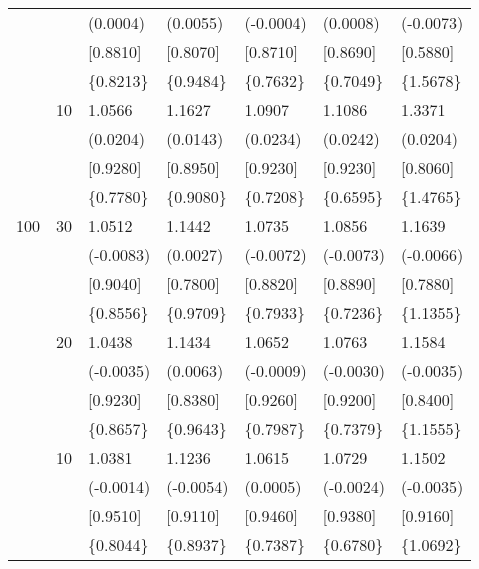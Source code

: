 \begin{table}[H]
{\begin{tabular}{c c | C{2.48cm} | C{2.48cm} | C{2.48cm} | C{2.48cm} | C{2.48cm} }
			&&(0.0004)&(0.0055)&(-0.0004)&(0.0008)&(-0.0073)\\
			&&[0.8810]&[0.8070]&[0.8710]&[0.8690]&[0.5880]\\
			&&\{0.8213\}&\{0.9484\}&\{0.7632\}&\{0.7049\}&\{1.5678\}\\
			&10&1.0566&1.1627&1.0907&1.1086&1.3371\\
			&&(0.0204)&(0.0143)&(0.0234)&(0.0242)&(0.0204)\\
			&&[0.9280]&[0.8950]&[0.9230]&[0.9230]&[0.8060]\\
			&&\{0.7780\}&\{0.9080\}&\{0.7208\}&\{0.6595\}&\{1.4765\}\\
			\cmidrule(lr){1-7}
			100&30&1.0512&1.1442&1.0735&1.0856&1.1639\\
			&&(-0.0083)&(0.0027)&(-0.0072)&(-0.0073)&(-0.0066)\\
			&&[0.9040]&[0.7800]&[0.8820]&[0.8890]&[0.7880]\\
			&&\{0.8556\}&\{0.9709\}&\{0.7933\}&\{0.7236\}&\{1.1355\}\\
			&20&1.0438&1.1434&1.0652&1.0763&1.1584\\
			&&(-0.0035)&(0.0063)&(-0.0009)&(-0.0030)&(-0.0035)\\
			&&[0.9230]&[0.8380]&[0.9260]&[0.9200]&[0.8400]\\
			&&\{0.8657\}&\{0.9643\}&\{0.7987\}&\{0.7379\}&\{1.1555\}\\
			&10&1.0381&1.1236&1.0615&1.0729&1.1502\\
			&&(-0.0014)&(-0.0054)&(0.0005)&(-0.0024)&(-0.0035)\\
			&&[0.9510]&[0.9110]&[0.9460]&[0.9380]&[0.9160]\\
			&&\{0.8044\}&\{0.8937\}&\{0.7387\}&\{0.6780\}&\{1.0692\}\\
			\bottomrule[1.5pt]
	\end{tabular}}
	\label{table:table S.4}
\end{table}

